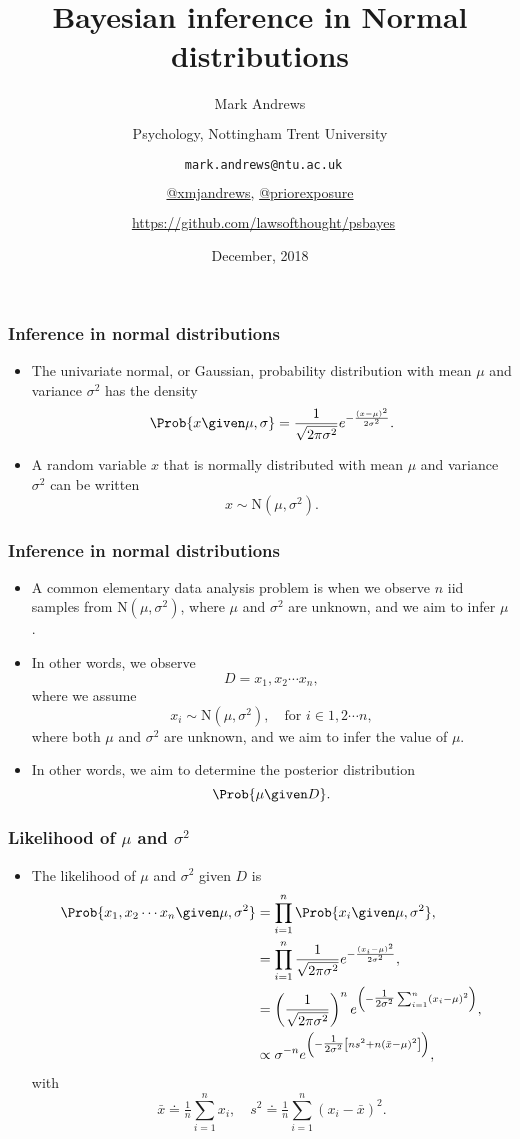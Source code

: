 \documentclass{slides}
\title[Bayesian Inference]{Bayesian inference in Normal distributions}
\author[Andrews]{Mark Andrews \\ $\phantom{foo}$ \\ Psychology, Nottingham Trent University \\ $\phantom{foo}$ \\ \faEnvelopeO \  \texttt{mark.andrews@ntu.ac.uk} \\ $\phantom{foo}$ \\ \faTwitter \href{https://twitter.com/xmjandrews}{@xmjandrews}, \faTwitter \href{https://twitter.com/priorexposure}{@priorexposure}\\ $\phantom{foo}$ \\ \faGithub \ \url{https://github.com/lawsofthought/psbayes}}
\date{December, 2018}
\begin{document}
{
	\begin{frame}
		\titlepage
	\end{frame}
}


\begin{frame}
	\frametitle{Inference in normal distributions}
	\begin{itemize}
		\item The univariate normal, or Gaussian, probability distribution with mean $\mu$ and variance $\sigma^2$ has the density
			\[
				\Prob{x\given\mu,\sigma} = \frac{1}{\sqrt{2\pi\sigma^2}}e^{-\frac{(x-\mu)^2}{2\sigma^2}}.
			\]
		\item A random variable $x$ that is normally distributed with mean $\mu$ and variance $\sigma^2$ can be written
			\[
				x \sim \textrm{N}(\mu, \sigma^2).
			\]

	\end{itemize}
\end{frame}

\begin{frame}
	\frametitle{Inference in normal distributions}
	\begin{itemize}
		\item A common elementary data analysis problem is when we
			observe $n$ iid samples from $\textrm{N}(\mu, \sigma^2)$, where
			$\mu$ and $\sigma^2$ are unknown, and we aim to infer
			$\mu$.

		\item In other words, we observe
			\[D = x_1, x_2 \cdots x_n,\]
			where we assume
			\[x_i \sim \textrm{N}(\mu, \sigma^2),\quad\text{for $i \in 1,2\cdots n$},\]
		      where both $\mu$ and $\sigma^2$ are unknown, and we aim to infer the value of $\mu$. 
		\item In other words, we aim to determine the posterior distribution
		      \[
			\Prob{\mu \given D}.
		      \]
	\end{itemize}
\end{frame}


\begin{frame}
	\frametitle{Likelihood of $\mu$ and $\sigma^2$}
	\begin{itemize}
		\item The likelihood of $\mu$ and $\sigma^2$ given $D$ is 
			\begin{align*}
				\Prob{x_1, x_2 \cdots x_n \given \mu, \sigma^2} &= \prod_{i=1}^n \Prob{x_i \given \mu, \sigma^2},\\
				&= \prod_{i=1}^n \frac{1}{\sqrt{2\pi\sigma^2}}e^{-\frac{(x_i-\mu)^2}{2\sigma^2}},\\
				&= \left(\frac{1}{\sqrt{2\pi\sigma^2}}\right)^n e^{\left(-\tfrac{1}{2\sigma^2}\sum_{i=1}^{n}(x_i - \mu)^2\right)},\\
				&\propto \sigma^{-n} e^{\left( -\tfrac{1}{2\sigma^2}\left[n s^2 + n(\bar{x}-\mu)^2\right] \right)},
			\end{align*}
			with \[
				\bar{x} \doteq \tfrac{1}{n} \sum_{i=1}^n x_i, \quad s^2 \doteq \tfrac{1}{n} \sum_{i=1}^n (x_i - \bar{x})^2.
			\]
	\end{itemize}

\end{frame}
\end{document}
